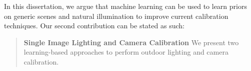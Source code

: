 In this dissertation, we argue that machine learning can be used to learn priors on generic scenes and natural illumination to improve current calibration techniques. Our second contribution can be stated as such:
\begin{quotation}
\textbf{Single Image Lighting and Camera Calibration} We present two learning-based approaches to perform outdoor lighting and camera calibration.
\end{quotation}

